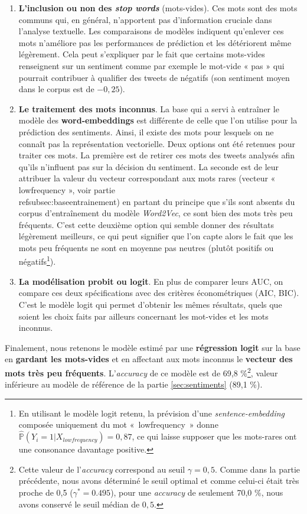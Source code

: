 \documentclass[11pt,french,french]{article}
\let\rmarkdownfootnote\footnote%
\def\footnote{\protect\rmarkdownfootnote}
\begin{document}
\begin{enumerate}
\item \textbf{L’inclusion ou non des \emph{stop words}} (mots-vides). 
Ces mots sont des mots communs qui, en général, n’apportent pas d’information cruciale dans l’analyse textuelle. Les comparaisons de modèles indiquent qu’enlever ces mots n’améliore pas les performances de prédiction et les détériorent même légèrement. Cela peut s’expliquer par le fait que certains mots-vides renseignent sur un sentiment comme par exemple le mot-vide « pas » qui pourrait contribuer à qualifier des tweets de négatifs (son sentiment moyen dans le corpus est de $-0,25$).

\item \textbf{Le traitement des mots inconnus}. La base qui a servi à entraîner le modèle des \textbf{word-embeddings} est différente de celle que l'on utilise pour la prédiction des sentiments.
Ainsi, il existe des mots pour lesquels on ne connaît pas la représentation vectorielle. 
Deux options ont été retenues pour traiter ces mots. 
La première est de retirer ces mots des tweets analysés afin qu'ils n’influent pas sur la décision du sentiment. 
La seconde est de leur attribuer la valeur du vecteur correspondant aux mots rares (vecteur « lowfrequency », voir partie \\ref{subsec:baseentrainement}) en partant du principe que s'ils sont absents du corpus d'entraînement du modèle \emph{Word2Vec}, ce sont bien des mots très peu fréquents. 
C’est cette deuxième option qui semble donner des résultats légèrement meilleurs, ce qui peut signifier que l’on capte alors le fait que les mots peu fréquents ne sont en moyenne pas neutres (plutôt positifs ou négatifs\footnote{En utilisant le modèle logit retenu, la prévision d'une \emph{sentence-embedding} composée uniquement du mot « lowfrequency » donne $\widehat{\mathbb{P}}(Y_i = 1 | X_{lowfrequency}) = 0,87$, ce qui laisse supposer que les mots-rares ont une consonance davantage positive.}). 

\item \textbf{La modélisation probit ou logit}. En plus de comparer leurs AUC, on compare ces deux spécifications avec des critères économétriques (AIC, BIC). C’est le modèle logit qui permet d’obtenir les mêmes résultats, quels que soient les choix faits par ailleurs concernant les mot-vides et les mots inconnus.
\end{enumerate}

Finalement, nous retenons le modèle estimé par une \textbf{régression logit} sur la base en \textbf{gardant les mots-vides} et en affectant aux mots inconnus le \textbf{vecteur des mots très peu fréquents}. L'\emph{accuracy} de ce modèle est de 69,8 \%\footnote{Cette valeur de l'\emph{accuracy} correspond au seuil \(\gamma = 0,5\). Comme dans la partie précédente, nous avons déterminé le seuil optimal et comme celui-ci était très proche de 0,5 (\(\gamma^* = 0.495\)), pour une \emph{accuracy} de seulement 70,0 \%, nous avons conservé le seuil médian de \(0,5\).}, valeur inférieure au modèle de référence de la partie \ref{sec:sentiments} (89,1 \%).
\end{document}
